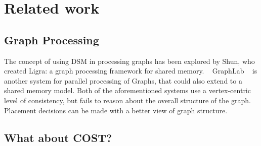 \section{Related work}
\label{sec:related}


\subsection{Graph Processing}

The concept of using DSM in processing graphs has been explored by Shun, who
created Ligra: a graph processing framework for shared memory. ~\cite{Shun:2013:ligra} 
GraphLab ~\cite{Low:2012:DGF:2212351.2212354} is another system for parallel
processing of Graphs, that could also extend to a shared memory model.
Both of the aforementioned systems use a vertex-centric level of consistency, 
but fails to reason about the overall structure of the graph. Placement decisions can be made with a better view of graph structure. 

\subsection{What about COST?}